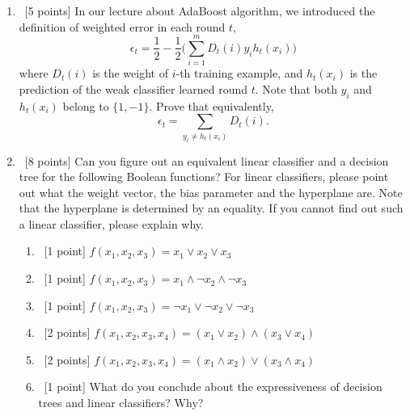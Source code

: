 \documentclass[12pt, fullpage,letterpaper]{article}
\begin{document}
\begin{enumerate}
\item~[5 points] In our lecture about AdaBoost algorithm, we introduced the definition of weighted error in each round $t$, 
\[
\epsilon_t = \frac{1}{2} - \frac{1}{2}\big(\sum_{i=1}^m D_t(i) y_i h_t(x_i)\big)
\]
where $D_t(i)$ is the weight of $i$-th training example, and $h_t(x_i)$ is the prediction of the weak classifier learned round $t$. Note that both $y_i$ and $h_t(x_i)$ belong to $\{1, -1\}$. Prove that equivalently,
\[
\epsilon_t = \sum_{y_i \neq h_t(x_i)} D_t(i).
\]

	\item~[8 points] Can you figure out an equivalent linear classifier and a decision tree for the following Boolean functions? For linear classifiers, please point out what the weight vector, the bias parameter and the hyperplane are. Note that the hyperplane is determined by an equality. If you cannot find out such a  linear classifier, please explain why. 
	\begin{enumerate}
		\item~[1 point] $f(x_1, x_2, x_3) = x_1 \lor x_2 \lor x_3$
		\item~[1 point] $f(x_1, x_2, x_3) = x_1 \land \neg x_2 \land \neg x_3$
		\item~[1 point] $f(x_1, x_2, x_3) = \neg x_1 \lor \neg x_2 \lor \neg x_3$ 
		\item~[2 points] $f(x_1, x_2, x_3, x_4) = (x_1 \lor x_2) \land (x_3 \lor x_4)$
		\item~[2 points] $f(x_1, x_2, x_3, x_4) = (x_1 \land x_2) \lor (x_3 \land x_4)$
		\item~[1 point] What do you conclude about the expressiveness of decision trees and linear classifiers? Why?
	\end{enumerate}
		

\end{enumerate}
\end{document}
